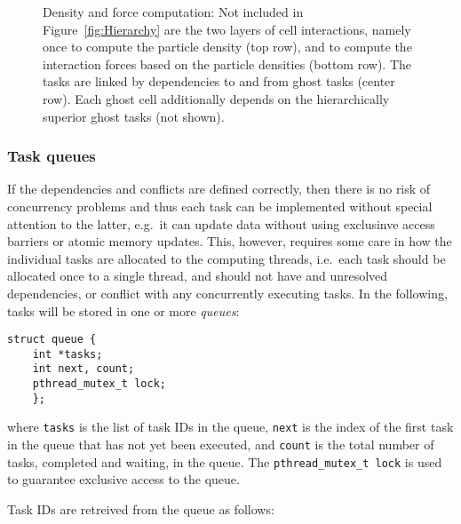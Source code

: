 \documentclass[final]{siamltex}
\newcommand{\fig}[1]
    {Figure~\ref{fig:#1}}
\begin{document}
\begin{figure}[ht]
    \centerline{}
    
    \caption{Density and force computation: Not included in \fig{Hierarchy}
        are the two layers of cell interactions, namely once to compute
        the particle density (top row), and to compute the interaction
        forces based on the particle densities (bottom row).
        The tasks are linked by dependencies to and from ghost tasks
        (center row).
        Each ghost cell additionally depends on the hierarchically superior
        ghost tasks (not shown).
        }
    \label{fig:DensityForce}
\end{figure}


\subsubsection{Task queues}

If the dependencies and conflicts are defined correctly, then
there is no risk of concurrency problems and thus each task
can be implemented without special attention to the latter,
e.g.~it can update data without using exclusinve access barriers
or atomic memory updates.
This, however, requires some care in how the individual tasks
are allocated to the computing threads, i.e.~each task should
be allocated once to a single thread, and should not have
and unresolved dependencies, or conflict with any concurrently
executing tasks.
In the following, tasks will be stored in one or more {\em queues}:
        
\begin{center}\begin{minipage}{0.8\textwidth}
    \begin{lstlisting}
struct queue {
    int *tasks;
    int next, count;
    pthread_mutex_t lock;
    };
    \end{lstlisting}
\end{minipage}\end{center}

\noindent where {\tt tasks} is the list of task IDs in the queue, {\tt next}
is the index of the first task in the queue that has not yet been executed,
and {\tt count} is the total number of tasks, completed and waiting,
in the queue.
The {\tt pthread\_mutex\_t lock} is used to guarantee exclusive access
to the queue.

Task IDs are retreived from the queue as follows:        
\end{document}

